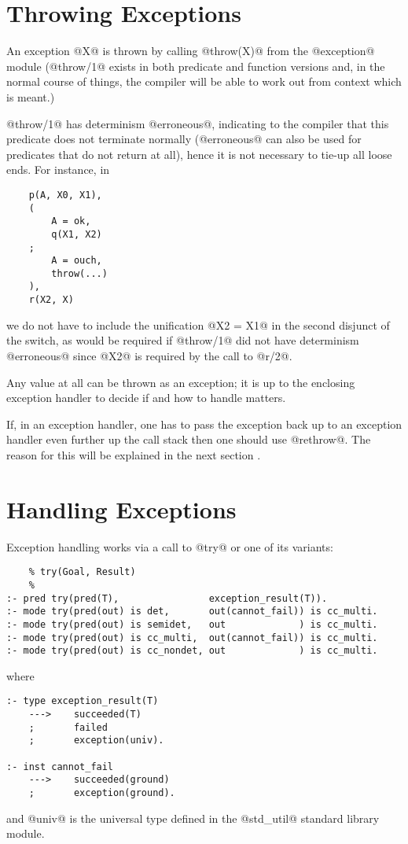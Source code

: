 \section{Throwing Exceptions}

An exception @X@ is thrown by calling @throw(X)@ from the @exception@
module (@throw/1@ exists in both predicate and function versions and, in
the normal course of things, the compiler will be able to work out from
context which is meant.)

@throw/1@ has determinism @erroneous@, indicating to the compiler that
this predicate does not terminate normally (@erroneous@ can also be used
for predicates that do not return at all), hence it is not necessary to
tie-up all loose ends.  For instance, in
\begin{verbatim}
    p(A, X0, X1),
    (
        A = ok,
        q(X1, X2)
    ;
        A = ouch,
        throw(...)
    ),
    r(X2, X)
\end{verbatim}
we do not have to include the unification @X2 = X1@ in the second
disjunct of the switch, as would be required if @throw/1@ did not have
determinism @erroneous@ since @X2@ is required by the call to @r/2@.

Any value at all can be thrown as an exception; it is up to the
enclosing exception handler to decide if and how to handle matters.

If, in an exception handler, one has to pass the exception back up to an
exception handler even further up the call stack then one should use
@rethrow@.  The reason for this will be explained in the next section
\XXX{}.

\section{Handling Exceptions}

Exception handling works via a call to @try@ or one of its variants:
\begin{verbatim}
    % try(Goal, Result)
    %
:- pred try(pred(T),                exception_result(T)).
:- mode try(pred(out) is det,       out(cannot_fail)) is cc_multi.
:- mode try(pred(out) is semidet,   out             ) is cc_multi.
:- mode try(pred(out) is cc_multi,  out(cannot_fail)) is cc_multi.
:- mode try(pred(out) is cc_nondet, out             ) is cc_multi.
\end{verbatim}
where
\begin{verbatim}
:- type exception_result(T)
    --->    succeeded(T)
    ;       failed
    ;       exception(univ).

:- inst cannot_fail
    --->    succeeded(ground)
    ;       exception(ground).
\end{verbatim}
and @univ@ is the universal type defined in the @std_util@ standard
library module.

